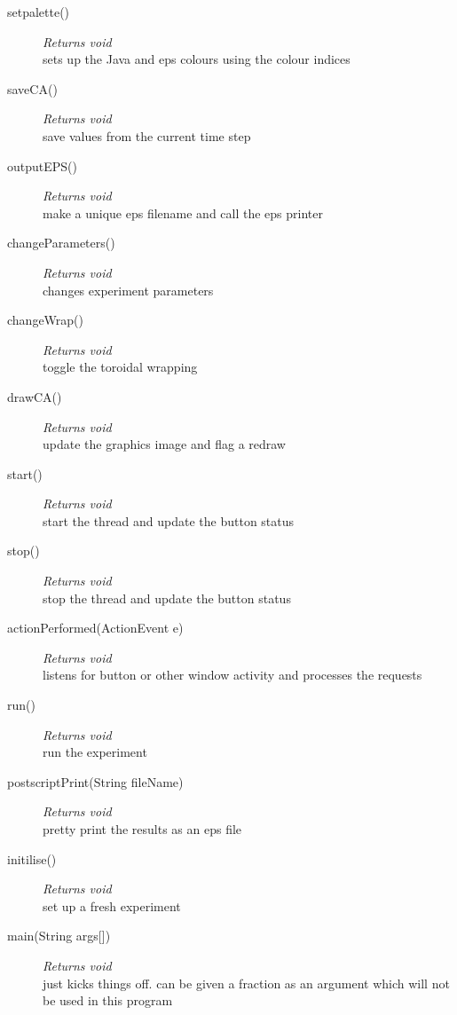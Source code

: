 \documentclass[11pt,a4paper]{article}
\newenvironment{di}
{\begin{flushright}
\begin{minipage}{0.95\textwidth}
\begin{description}
}
{\end{description}
\end{minipage}
\end{flushright}
}
\begin{document}
\begin{di}
\item[{setpalette()}]\emph{Returns void}\\
sets up the Java and eps colours using the colour indices\\
\item[{saveCA()}]\emph{Returns void}\\
save values from the current time step\\
\item[{outputEPS()}]\emph{Returns void}\\
make a unique eps filename and call the eps printer\\
\item[{changeParameters()}]\emph{Returns void}\\
changes experiment parameters\\
\item[{changeWrap()}]\emph{Returns void}\\
toggle the toroidal wrapping\\
\item[{drawCA()}]\emph{Returns void}\\
update the graphics image and flag a redraw\\
\item[{start()}]\emph{Returns void}\\
start the thread and update the button status\\
\item[{stop()}]\emph{Returns void}\\
stop the thread and update the button status\\
\item[{actionPerformed(ActionEvent e)}]\emph{Returns void}\\
listens for button or other window activity and processes the requests\\
\end{di}
\begin{di}
\item[{run()}]\emph{Returns void}\\
run the experiment\\
\item[{postscriptPrint(String fileName)}]\emph{Returns void}\\
pretty print the results as an eps file\\
\item[{initilise()}]\emph{Returns void}\\
set up a fresh experiment\\
\item[{main(String args[])}]\emph{Returns void}\\
just kicks things off. can be given a fraction as an argument which will not be used in this program\\
\end{di}
\end{document}
